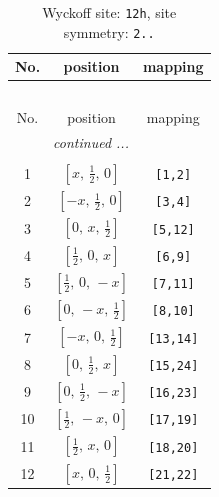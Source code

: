 \documentclass[fleqn,8pt]{jsarticle}
\begin{document}
\begin{longtable}{ccc}
\caption{Wyckoff site: {\tt 12h}, site symmetry: {\tt 2..}}
 \\
 \hline \hline
No. & position & mapping \\ \hline \endfirsthead

\multicolumn{2}{l}{\tablename\ \thetable{}} \\
 \hline \hline
No. & position & mapping \\ \hline \endhead

 \hline \hline
\multicolumn{2}{r}{\footnotesize\it continued ...} \\ \endfoot

 \hline \hline
\multicolumn{2}{r}{} \\ \endlastfoot

1 & $\left[ x,\, \frac{1}{2},\, 0 \right]$ & {\tt [1,2]} \\ \hline
2 & $\left[ - x,\, \frac{1}{2},\, 0 \right]$ & {\tt [3,4]} \\ \hline
3 & $\left[ 0,\, x,\, \frac{1}{2} \right]$ & {\tt [5,12]} \\ \hline
4 & $\left[ \frac{1}{2},\, 0,\, x \right]$ & {\tt [6,9]} \\ \hline
5 & $\left[ \frac{1}{2},\, 0,\, - x \right]$ & {\tt [7,11]} \\ \hline
6 & $\left[ 0,\, - x,\, \frac{1}{2} \right]$ & {\tt [8,10]} \\ \hline
7 & $\left[ - x,\, 0,\, \frac{1}{2} \right]$ & {\tt [13,14]} \\ \hline
8 & $\left[ 0,\, \frac{1}{2},\, x \right]$ & {\tt [15,24]} \\ \hline
9 & $\left[ 0,\, \frac{1}{2},\, - x \right]$ & {\tt [16,23]} \\ \hline
10 & $\left[ \frac{1}{2},\, - x,\, 0 \right]$ & {\tt [17,19]} \\ \hline
11 & $\left[ \frac{1}{2},\, x,\, 0 \right]$ & {\tt [18,20]} \\ \hline
12 & $\left[ x,\, 0,\, \frac{1}{2} \right]$ & {\tt [21,22]} \\
\end{longtable}
\renewcommand{\arraystretch}{1.2}
\end{document}
